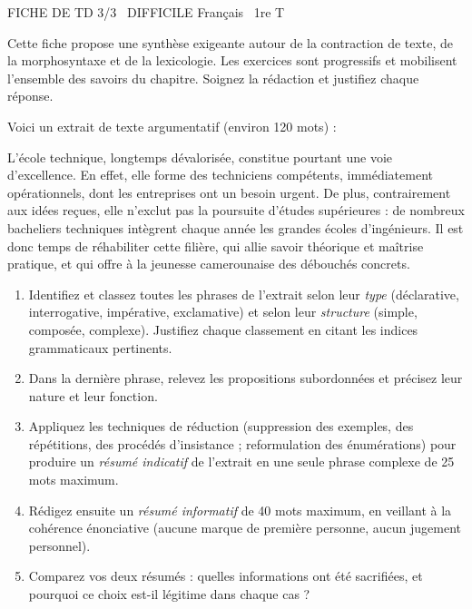 \documentclass[11pt]{article}
\begin{document}
\begin{tcolorbox}[enhanced,colback=popink,colframe=popink,arc=10pt,boxrule=0pt,left=12pt,right=12pt,top=9pt,bottom=9pt]
{\color{white}\popxbold\small FICHE DE TD 3/3 \textbullet\ DIFFICILE \hfill Français \textbullet\ 1re T\par}
\end{tcolorbox}
\vspace{4pt}
Cette fiche propose une synthèse exigeante autour de la contraction de texte, de la morphosyntaxe et de la lexicologie. Les exercices sont progressifs et mobilisent l'ensemble des savoirs du chapitre. Soignez la rédaction et justifiez chaque réponse.

\begin{exercice}
Voici un extrait de texte argumentatif (environ 120 mots) :

\og L'école technique, longtemps dévalorisée, constitue pourtant une voie d'excellence. En effet, elle forme des techniciens compétents, immédiatement opérationnels, dont les entreprises ont un besoin urgent. De plus, contrairement aux idées reçues, elle n'exclut pas la poursuite d'études supérieures : de nombreux bacheliers techniques intègrent chaque année les grandes écoles d'ingénieurs. Il est donc temps de réhabiliter cette filière, qui allie savoir théorique et maîtrise pratique, et qui offre à la jeunesse camerounaise des débouchés concrets. \fg

\begin{enumerate}
\item Identifiez et classez toutes les phrases de l'extrait selon leur \emph{type} (déclarative, interrogative, impérative, exclamative) et selon leur \emph{structure} (simple, composée, complexe). Justifiez chaque classement en citant les indices grammaticaux pertinents.
\item Dans la dernière phrase, relevez les propositions subordonnées et précisez leur nature et leur fonction.
\item Appliquez les techniques de réduction (suppression des exemples, des répétitions, des procédés d'insistance ; reformulation des énumérations) pour produire un \emph{résumé indicatif} de l'extrait en une seule phrase complexe de 25 mots maximum.
\item Rédigez ensuite un \emph{résumé informatif} de 40 mots maximum, en veillant à la cohérence énonciative (aucune marque de première personne, aucun jugement personnel).
\item Comparez vos deux résumés : quelles informations ont été sacrifiées, et pourquoi ce choix est-il légitime dans chaque cas ?
\end{enumerate}
\end{exercice}
\end{document}
